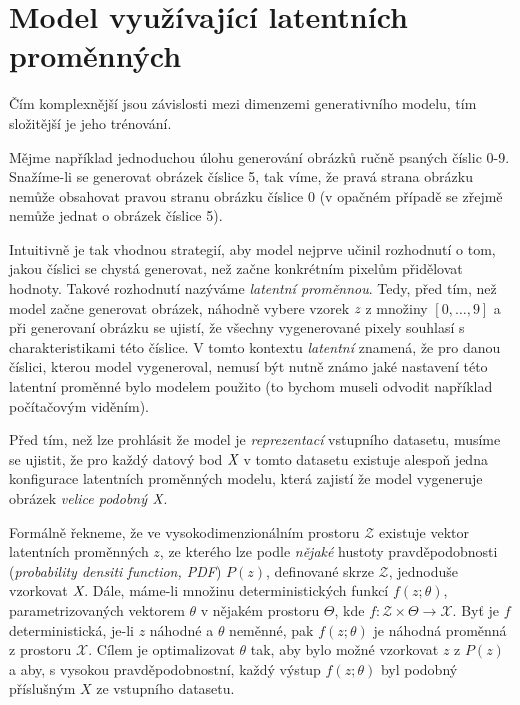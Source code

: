 \section{Model využívající latentních proměnných}

Čím komplexnější jsou závislosti mezi dimenzemi generativního modelu, tím složitější je jeho trénování.

Mějme například jednoduchou úlohu generování obrázků ručně psaných číslic 0-9.
Snažíme-li se generovat obrázek číslice 5, tak víme, že pravá strana obrázku nemůže obsahovat pravou stranu obrázku číslice 0 (v opačném případě se zřejmě nemůže jednat o obrázek číslice 5).

Intuitivně je tak vhodnou strategií, aby model nejprve učinil rozhodnutí o tom, jakou číslici se chystá generovat, než začne konkrétním pixelům přidělovat hodnoty.
Takové rozhodnutí nazýváme \emph{latentní proměnnou}. Tedy, před tím, než model začne generovat obrázek, náhodně vybere vzorek $\emph{z}$ z množiny $[0, \dots, 9]$ a při generovaní obrázku se ujistí, že všechny vygenerované pixely souhlasí s charakteristikami této číslice.
V tomto kontextu \emph{latentní} znamená, že pro danou číslici, kterou model vygeneroval, nemusí být nutně známo jaké nastavení této latentní proměnné bylo modelem použito (to bychom museli odvodit například počítačovým viděním). \cite{Doersch2021}

Před tím, než lze prohlásit že model je \emph{reprezentací} vstupního datasetu, musíme se ujistit, že pro každý datový bod $\emph{X}$ v tomto datasetu existuje alespoň jedna konfigurace latentních proměnných modelu, která zajistí že model vygeneruje obrázek \emph{velice podobný} $\emph{X}$.

Formálně řekneme, že ve vysokodimenzionálním prostoru $\mathcal{Z}$ existuje vektor latentních proměnných $z$, ze kterého lze podle \emph{nějaké} hustoty pravděpodobnosti (\emph{probability densiti function, PDF}) $P(z)$, definované skrze $\mathcal{Z}$, jednoduše vzorkovat $\emph{X}$.
Dále, máme-li množinu deterministických funkcí $f(z;\theta)$, parametrizovaných vektorem $\theta$ v nějakém prostoru $\Theta$, kde $f: \mathcal{Z} \times \Theta \rightarrow \mathcal{X}$. Byť je $f$ deterministická, je-li $z$ náhodné a $\theta$ neměnné, pak $f(z;\theta)$ je náhodná proměnná z prostoru $\mathcal{X}$. Cílem je optimalizovat $\theta$ tak, aby bylo možné vzorkovat $z$ z $P(z)$ a aby, s vysokou pravděpodobnostní, každý výstup $f(z; \theta)$ byl podobný příslušným $X$ ze vstupního datasetu. \cite{Doersch2021}

